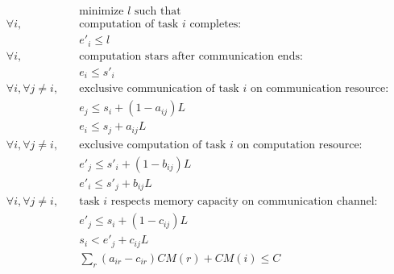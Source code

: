 \documentclass[sigconf]{acmart}
\begin{document}
	\vspace*{-0.5cm}
	\begin{align*}
		& \text{minimize } l \text{ such that }\\
		\forall i, \quad & \text{computation of task } i \text{ completes:}\\
		& e'_i \leq l\\
		\forall i, \quad & \text{computation stars after communication ends:}\\
		& e_i \leq s'_i\\
		\forall i, \forall j\ne i, \quad & \text{exclusive communication of task } i \text{ on communication resource:}\\
		& e_j \leq s_i +(1-a_{ij})L\\
		& e_i\leq s_j +a_{ij}L\\
		\forall i, \forall j\ne i, \quad & \text{exclusive computation of task } i \text{ on computation resource:}\\
		& e'_j \leq s'_i +(1-b_{ij})L\\
		& e'_i\leq s'_j +b_{ij}L\\
		\forall i, \forall j\ne i, \quad & \text{task } i \text{ respects memory capacity on communication channel:}\\
		& e'_j \leq s_i +(1-c_{ij})L\\
		& s_i< e'_j +c_{ij}L\\
		& \sum_r (a_{ir} - c_{ir})CM(r) + CM(i) \le C\\
	\end{align*} 
	
\end{document}
